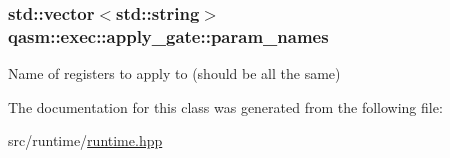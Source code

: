 \subsubsection[{\texorpdfstring{param\+\_\+names}{param_names}}]{\setlength{\rightskip}{0pt plus 5cm}std\+::vector$<$std\+::string$>$ qasm\+::exec\+::apply\+\_\+gate\+::param\+\_\+names}\hypertarget{classqasm_1_1exec_1_1apply__gate_afa925dd76a3c14f5a3739bbd1ab20258}{}\label{classqasm_1_1exec_1_1apply__gate_afa925dd76a3c14f5a3739bbd1ab20258}
Name of registers to apply to (should be all the same) 

The documentation for this class was generated from the following file\+:\begin{DoxyCompactItemize}
\item 
src/runtime/\hyperlink{runtime_8hpp}{runtime.\+hpp}\end{DoxyCompactItemize}
